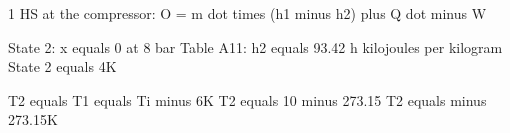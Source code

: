 1 HS at the compressor:  
O = m dot times (h1 minus h2) plus Q dot minus W  

State 2: x equals 0 at 8 bar  
Table A11: h2 equals 93.42 h kilojoules per kilogram  
State 2 equals 4K  

T2 equals T1 equals Ti minus 6K  
T2 equals 10 minus 273.15  
T2 equals minus 273.15K